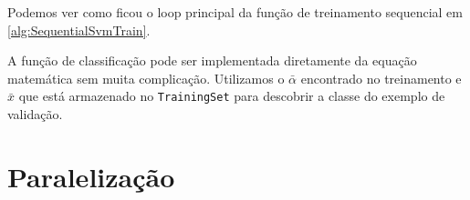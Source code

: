 Podemos ver como ficou o loop principal da função de treinamento sequencial em \ref{alg:SequentialSvmTrain}.


A função de classificação pode ser implementada diretamente da equação matemática sem muita complicação. Utilizamos o $\bar{\alpha}$ encontrado no treinamento e $\bar{x}$ que está armazenado no \texttt{TrainingSet} para descobrir a classe do exemplo de validação.


\section{Paralelização}

